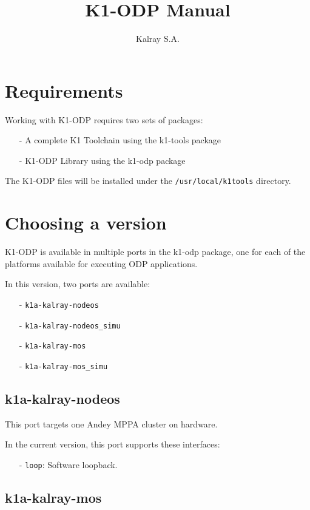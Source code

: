 \documentclass{trkalray}
\author{%
Kalray S.A.\autref{1}
}
\institute{%
\autlabel{1} \email{support@kalray.eu},
Kalray S.A.
}
\title{K1-ODP Manual}
\begin{document}
\maketitle

\tableofcontents

\newpage
\section{Requirements}

Working with K1-ODP requires two sets of packages:
\begin{itemize}
\item[-]{A complete K1 Toolchain using the k1-tools package}
\item[-]{K1-ODP Library using the k1-odp package}
\end{itemize}

The K1-ODP files will be installed under the
\texttt{/usr/local/k1tools} directory.

\section{Choosing a version}
K1-ODP is available in multiple ports in the k1-odp package, one for
each of the platforms available for executing ODP applications.

In this version, two ports are available:
\begin{itemize}
\item[-]{\texttt{k1a-kalray-nodeos}}
\item[-]{\texttt{k1a-kalray-nodeos\_simu}}
\item[-]{\texttt{k1a-kalray-mos}}
\item[-]{\texttt{k1a-kalray-mos\_simu}}
\end{itemize}

\subsection{k1a-kalray-nodeos}

This port targets one Andey MPPA cluster on hardware.

In the current version, this port supports these interfaces:
\begin{itemize}
\item[-]{\texttt{loop}: Software loopback.}
\end{itemize}

\subsection{k1a-kalray-mos}
\end{document}
